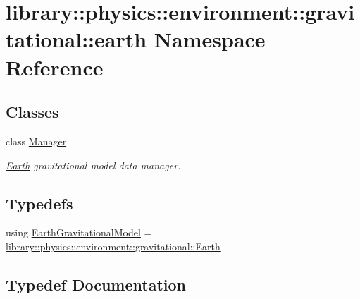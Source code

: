 \hypertarget{namespacelibrary_1_1physics_1_1environment_1_1gravitational_1_1earth}{}\section{library\+:\+:physics\+:\+:environment\+:\+:gravitational\+:\+:earth Namespace Reference}
\label{namespacelibrary_1_1physics_1_1environment_1_1gravitational_1_1earth}
\subsection*{Classes}
\begin{DoxyCompactItemize}
\item 
class \hyperlink{classlibrary_1_1physics_1_1environment_1_1gravitational_1_1earth_1_1_manager}{Manager}
\begin{DoxyCompactList}\small\item\em \hyperlink{classlibrary_1_1physics_1_1environment_1_1gravitational_1_1_earth}{Earth} gravitational model data manager. \end{DoxyCompactList}\end{DoxyCompactItemize}
\subsection*{Typedefs}
\begin{DoxyCompactItemize}
\item 
using \hyperlink{namespacelibrary_1_1physics_1_1environment_1_1gravitational_1_1earth_a37840632ad4cdb3452b8dac84ed6e176}{Earth\+Gravitational\+Model} = \hyperlink{classlibrary_1_1physics_1_1environment_1_1gravitational_1_1_earth}{library\+::physics\+::environment\+::gravitational\+::\+Earth}
\end{DoxyCompactItemize}


\subsection{Typedef Documentation}
\mbox{\label{namespacelibrary_1_1physics_1_1environment_1_1gravitational_1_1earth_a37840632ad4cdb3452b8dac84ed6e176}} 
